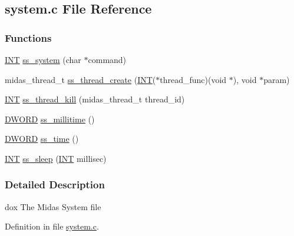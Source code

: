 \subsection{system.c File Reference}
\label{system_8c}
\subsubsection*{Functions}
\begin{DoxyCompactItemize}
\item 
\hyperlink{vppg_8h_a392e62da233ed3e2f7c3fd4f487a3896}{INT} \hyperlink{group__msfunctionc_ga9b90d0865a3eb4720bd39edcaba9edba}{ss\_\-system} (char $\ast$command)
\item 
midas\_\-thread\_\-t \hyperlink{group__msfunctionc_ga29342b1b9eaa66a0076dd0876090087d}{ss\_\-thread\_\-create} (\hyperlink{vppg_8h_a392e62da233ed3e2f7c3fd4f487a3896}{INT}($\ast$thread\_\-func)(void $\ast$), void $\ast$param)
\item 
\hyperlink{vppg_8h_a392e62da233ed3e2f7c3fd4f487a3896}{INT} \hyperlink{group__msfunctionc_gacf452572de3c2f6c5c899bc4a19aeaac}{ss\_\-thread\_\-kill} (midas\_\-thread\_\-t thread\_\-id)
\item 
\hyperlink{vt2_8h_a798af1e30bc65f319c1a246cecf59e39}{DWORD} \hyperlink{group__msfunctionc_ga999b383482224a5a6c4f5974d2625717}{ss\_\-millitime} ()
\item 
\hyperlink{vt2_8h_a798af1e30bc65f319c1a246cecf59e39}{DWORD} \hyperlink{group__msfunctionc_gab7852119bd4dc1e08aa03127d8ca008b}{ss\_\-time} ()
\item 
\hyperlink{vppg_8h_a392e62da233ed3e2f7c3fd4f487a3896}{INT} \hyperlink{group__msfunctionc_gaf877acb3de6be606dd427a84aa7b6dda}{ss\_\-sleep} (\hyperlink{vppg_8h_a392e62da233ed3e2f7c3fd4f487a3896}{INT} millisec)
\end{DoxyCompactItemize}


\subsubsection{Detailed Description}
dox The Midas System file 

Definition in file \hyperlink{system_8c_source}{system.c}.